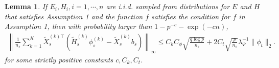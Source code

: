 \documentclass[12pt]{article}
\newtheorem{lemma}{Lemma}
\newenvironment{pf}{{\noindent \it Proof}\ }{\hfill $\square$\par}
\begin{document}
\begin{lemma}
    \label{lem:trimed_uncorelated_bias}
    If $E_i,H_i,i=1,\cdots,n$ are i.i.d. sampled from distributions for $E$ and $H$ that satisfies Assumption 1 and the function $f$ satisfies the condition for $f$ in Assumption 1, then with probability larger than $1 - p^{-c} - \exp(-cn)$,
    \begin{align*}
        \left\|\frac{1}{n_s}\sum_{k=1}^K \tilde{X}_s^{(k)\top}\left(\tilde{H}_s^{(k)}\phi_s^{(k)}- \tilde{X}_s^{(k)}b_s\right)\right\|_{\infty}\le C_kC_\phi \sqrt{\frac{q\log p}{n_s}}+  2C_t \sqrt{\frac{p}{n_s}}\lambda_\Psi^{-1} \|\phi_t\|_2. 
    \end{align*}
    for some strictly positive constants $c,C_k,C_t$. 
\end{lemma}
\end{document}
